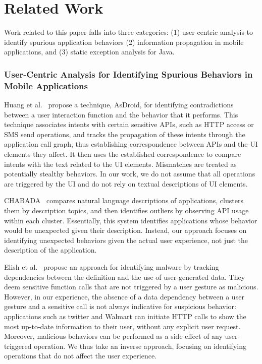 \section{Related Work}
\label{sec:related}
Work related to this paper falls into three categories: (1)
user-centric analysis to identify spurious application behaviors (2)
information propagation in mobile applications, and (3) static
exception analysis for Java. 

\subsubsection{User-Centric Analysis for Identifying Spurious Behaviors in Mobile Applications}
Huang et al.~\cite{Huang:Zhang:Tan:Wang:Liang:ICSE14} propose a technique, AsDroid, for identifying contradictions between a user interaction function and the behavior that it performs. 
This technique associates intents with certain sensitive APIs, such as HTTP access or SMS send operations, and tracks the propagation
of these intents through the application call graph, thus establishing correspondence between APIs and the UI elements they affect. 
It then uses the established correspondence to compare intents with the text related to the UI elements. Mismatches are treated as potentially stealthy behaviors. 
In our work, we do not assume that all operations are triggered by the UI
and do not rely on textual descriptions of UI elements.

CHABADA~\cite{Gorla:Tavecchia:Gross:Zeller:ICSE14} compares natural language descriptions of applications, clusters them by description topics, and then identifies outliers by observing API usage within each cluster. Essentially, this system identifies applications whose behavior would be unexpected given their description. Instead, our approach focuses on identifying unexpected behaviors given the actual user experience, not just the description of the application.

Elish et al.~\cite{Elish:Yao:Ryder:MOST12} propose an approach for identifying malware by tracking dependencies between the definition and the use of user-generated data. They deem sensitive function calls that are not triggered by a user gesture as malicious. However, in our experience, the absence of a data dependency between a user gesture and a sensitive call is not always indicative for suspicious behavior: applications such as twitter and Walmart can initiate HTTP calls to show the most up-to-date information to their user, without any explicit user request. Moreover, malicious behaviors can be performed as a side-effect of any user-triggered operation. We thus take an inverse approach, focusing on identifying operations that do not affect the user experience.

